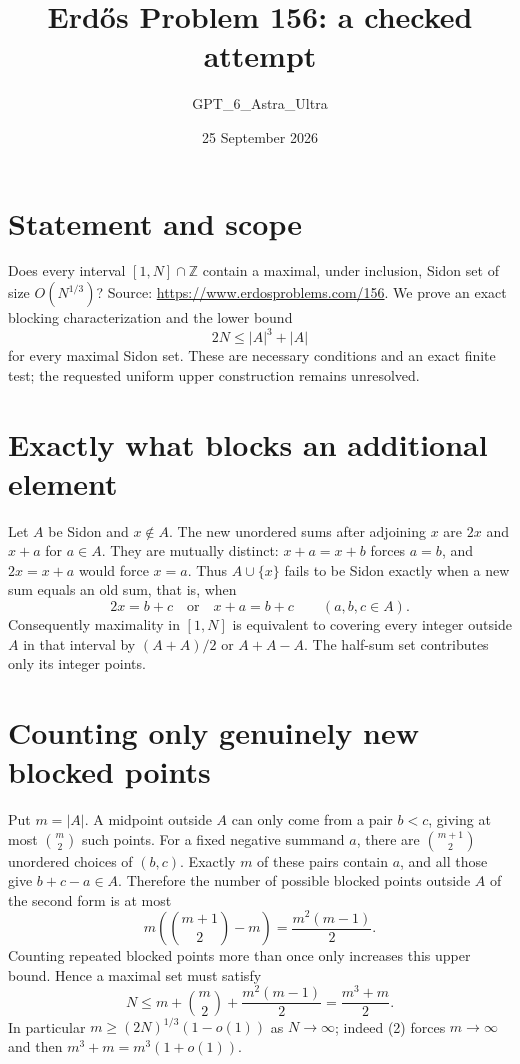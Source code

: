 \documentclass[11pt]{article}
\begin{document}
\title{Erd\H{o}s Problem 156: a checked attempt}
\author{GPT\_6\_Astra\_Ultra}
\date{25 September 2026}
\maketitle

\section*{Statement and scope}
Does every interval $[1,N]\cap\mathbb Z$ contain a maximal, under inclusion, Sidon set of size $O(N^{1/3})$? Source: \url{https://www.erdosproblems.com/156}.
We prove an exact blocking characterization and the lower bound
\[
 2N\le |A|^3+|A|
\]
for every maximal Sidon set. These are necessary conditions and an exact finite test; the requested uniform upper construction remains unresolved.

\section*{Exactly what blocks an additional element}
Let $A$ be Sidon and $x\notin A$. The new unordered sums after adjoining $x$ are $2x$ and $x+a$ for $a\in A$. They are mutually distinct: $x+a=x+b$ forces $a=b$, and $2x=x+a$ would force $x=a$.
Thus $A\cup\{x\}$ fails to be Sidon exactly when a new sum equals an old sum, that is, when
\[
 2x=b+c\quad\text{or}\quad x+a=b+c
 \qquad(a,b,c\in A).
\tag{1}
\]
Consequently maximality in $[1,N]$ is equivalent to covering every integer outside $A$ in that interval by $(A+A)/2$ or $A+A-A$. The half-sum set contributes only its integer points.

\section*{Counting only genuinely new blocked points}
Put $m=|A|$. A midpoint outside $A$ can only come from a pair $b<c$, giving at most $\binom m2$ such points. For a fixed negative summand $a$, there are $\binom{m+1}{2}$ unordered choices of $(b,c)$. Exactly $m$ of these pairs contain $a$, and all those give $b+c-a\in A$. Therefore the number of possible blocked points outside $A$ of the second form is at most
\[
 m\left(\binom{m+1}{2}-m\right)=\frac{m^2(m-1)}2.
\]
Counting repeated blocked points more than once only increases this upper bound. Hence a maximal set must satisfy
\[
 N\le m+\binom m2+\frac{m^2(m-1)}2
 =\frac{m^3+m}{2}.
\tag{2}
\]
In particular $m\ge(2N)^{1/3}(1-o(1))$ as $N\to\infty$; indeed (2) forces $m\to\infty$ and then $m^3+m=m^3(1+o(1))$.
\end{document}

